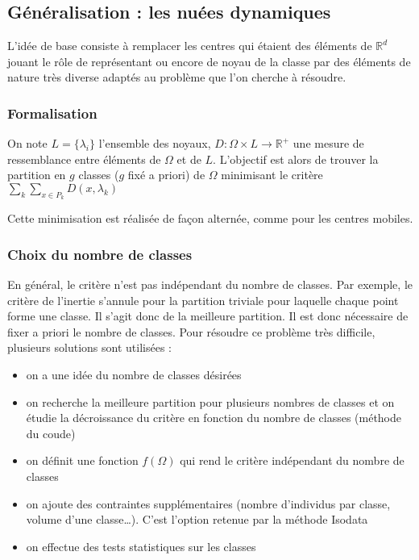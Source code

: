 \documentclass[letterpaper,10pt,english]{jupyterBook}
\begin{document}
\subsection{Généralisation : les nuées dynamiques}
\label{\detokenize{clustering:generalisation-les-nuees-dynamiques}}
\ignorespaces 
\sphinxAtStartPar
L’idée de base consiste à remplacer les centres   qui étaient des éléments de \(\mathbb{R}^d\) jouant le rôle de représentant ou encore de noyau de la classe par des éléments de nature très diverse adaptés au problème que l’on cherche à résoudre.


\subsubsection{Formalisation}
\label{\detokenize{clustering:formalisation}}
\sphinxAtStartPar
On note \(L=\{\lambda_i\}\) l’ensemble des noyaux, \(D:\Omega\times L\rightarrow \mathbb{R}^+\) une mesure de ressemblance entre éléments de \(\Omega\) et de \(L\). L’objectif est alors de trouver la partition en \(g\) classes (\(g\) fixé a priori) de \(\Omega\) minimisant le critère \(\displaystyle\sum_{k}\displaystyle\sum_{x\in P_k}D(x,\lambda_k)\)

\sphinxAtStartPar
Cette minimisation est réalisée de façon alternée, comme pour les centres mobiles.


\subsubsection{Choix du nombre de classes}
\label{\detokenize{clustering:choix-du-nombre-de-classes}}
\sphinxAtStartPar
En général, le critère n’est pas indépendant du nombre de classes. Par exemple, le critère de l’inertie s’annule pour la partition triviale pour laquelle chaque point forme une classe. Il s’agit donc de la meilleure partition. Il est donc
nécessaire de fixer a priori le nombre de classes. Pour résoudre ce problème très difficile, plusieurs solutions sont utilisées :
\begin{itemize}
\item {} 
\sphinxAtStartPar
on a une idée du nombre de classes désirées

\item {} 
\sphinxAtStartPar
on recherche la meilleure partition pour plusieurs nombres de classes et on étudie la décroissance du critère en fonction du nombre de classes (méthode du coude)

\item {} 
\sphinxAtStartPar
on définit une fonction \(f(\Omega)\) qui rend le critère indépendant du nombre de classes

\item {} 
\sphinxAtStartPar
on ajoute des contraintes supplémentaires (nombre d’individus par classe, volume d’une classe…). C’est l’option retenue par la méthode Isodata

\item {} 
\sphinxAtStartPar
on effectue des tests statistiques sur les classes

\end{itemize}
\end{document}
